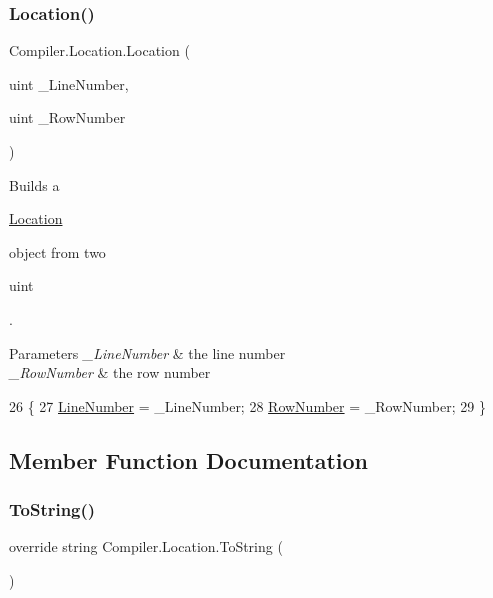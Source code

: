 \subsubsection{\texorpdfstring{Location()}{Location()}}
{\footnotesize\ttfamily Compiler.\+Location.\+Location (\begin{DoxyParamCaption}\item[{uint}]{\+\_\+\+Line\+Number,  }\item[{uint}]{\+\_\+\+Row\+Number }\end{DoxyParamCaption})}

Builds a
\begin{DoxyCode}
\mbox{\hyperlink{class_compiler_1_1_location_a389e64f3314c314948b740af8de9dcea}{Location}} 
\end{DoxyCode}
 object from two
\begin{DoxyCode}
uint 
\end{DoxyCode}
 . 
\begin{DoxyParams}{Parameters}
{\em \+\_\+\+Line\+Number} & the line number \\
\hline
{\em \+\_\+\+Row\+Number} & the row number \\
\hline
\end{DoxyParams}

\begin{DoxyCode}
26                                                                \{
27                 \mbox{\hyperlink{class_compiler_1_1_location_a71feb3bfd70af6096dc48451765ba284}{LineNumber}} = \_LineNumber;
28                 \mbox{\hyperlink{class_compiler_1_1_location_a766213e18168dcb22d657bee4f047ed9}{RowNumber}} = \_RowNumber;
29             \}
\end{DoxyCode}


\subsection{Member Function Documentation}
\mbox{\label{class_compiler_1_1_location_a44ca3fe0ddbc48974f1f85fc6df0ba90}} 
\subsubsection{\texorpdfstring{To\+String()}{ToString()}}
{\footnotesize\ttfamily override string Compiler.\+Location.\+To\+String (\begin{DoxyParamCaption}{ }\end{DoxyParamCaption})}

